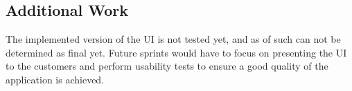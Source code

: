 \subsection{Additional Work}
The implemented version of the UI is not tested yet, and as of such can not be determined as final yet.
Future sprints would have to focus on presenting the UI to the customers and perform usability tests to ensure a good quality of the application is achieved.
